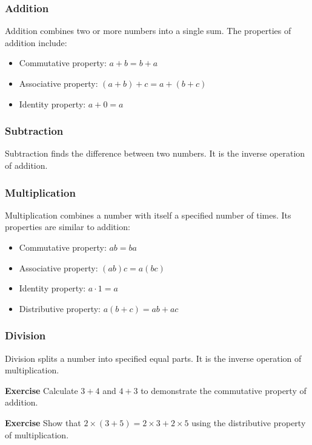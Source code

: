 \documentclass[a4paper,12pt]{book}
\newenvironment{exercise}[1][]
  {\par\medskip\noindent\textbf{Exercise #1} \rmfamily}
  {\medskip}
\begin{document}
\subsubsection{Addition}
Addition combines two or more numbers into a single sum. The properties of addition include:
\begin{itemize}
    \item Commutative property: \( a + b = b + a \)
    \item Associative property: \( (a + b) + c = a + (b + c) \)
    \item Identity property: \( a + 0 = a \)
\end{itemize}


\subsubsection{Subtraction}
Subtraction finds the difference between two numbers. It is the inverse operation of addition.


\subsubsection{Multiplication}
Multiplication combines a number with itself a specified number of times. Its properties are similar to addition:
\begin{itemize}
    \item Commutative property: \( ab = ba \)
    \item Associative property: \( (ab)c = a(bc) \)
    \item Identity property: \( a \cdot 1 = a \)
    \item Distributive property: \( a(b + c) = ab + ac \)
\end{itemize}


\subsubsection{Division}
Division splits a number into specified equal parts. It is the inverse operation of multiplication.


\begin{exercise}
Calculate \( 3 + 4 \) and \( 4 + 3 \) to demonstrate the commutative property of addition.
\end{exercise}


\begin{exercise}
Show that \( 2 \times (3 + 5) = 2 \times 3 + 2 \times 5 \) using the distributive property of multiplication.
\end{exercise}
\end{document}
